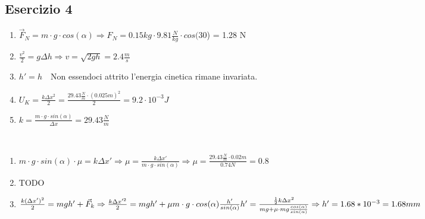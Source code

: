 \documentclass{article}
\begin{document}
\subsection*{Esercizio 4}
\begin{enumerate}[label=\textbf{4a.\alph*)}]
    \item $\vec{F}_N = m\cdot g\cdot cos(\alpha) \Rightarrow F_N = 0.15kg \cdot 9.81 \frac{N}{kg}
        \cdot cos(30$\textdegree) = 1.28 N
    \item $\frac{v^2}{2}=g\Delta h \Rightarrow v=\sqrt{2gh} =2.4\frac{m}{s}$
    \item $h'= h$\ \textrightarrow\ Non essendoci attrito l'energia cinetica rimane invariata.
    \item $U_K = \frac{k\Delta x^2}{2}=\frac{29.43 \frac{N}{m} \cdot (0.025m)^2}{2} = 9.2 \cdot 10^{-3} J$
    \item $k= \frac{m\cdot g\cdot sin(\alpha)}{\Delta x}=29.43 \frac{N}{m}$
\end{enumerate} \phantom{}\\
\begin{enumerate}[label=\textbf{4b.\alph*)}]
    \item $m\cdot g\cdot sin(\alpha)\cdot \mu = k\Delta x' \Rightarrow
        \mu= \frac{k\Delta x'}{m\cdot g\cdot sin(\alpha)} \Rightarrow
        \mu= \frac{29.43 \frac{N}{m}\cdot 0.02m}{0.74N}=0.8$
    \item TODO
    \item $\frac{k(\Delta x')^2}{2}=mgh'+ \vec{F}_k \Rightarrow
        \frac{k\Delta x'^2}{2}=mgh'+\mu m\cdot g\cdot cos(\alpha)\frac{h'}{sin(\alpha)}\\
        h'=\frac{\frac{1}{2} k\Delta x^2}{mg+\mu \cdot mg \frac{cos(\alpha)}{sin(\alpha)}}
        \Rightarrow h'=1.68*10^{-3}=1.68mm$
\end{enumerate}
\end{document}
